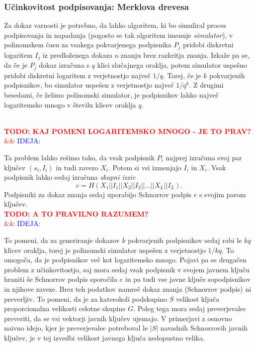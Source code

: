 \documentclass[isrm2, tisk]{fmfdelo}
\newcommand{\todo}[2][]{%
    \textcolor{red}{%
        \\ \textbf{\uppercase{todo: #2}}%
        \\%
        \ifx&#1&%
        \else%
            \textcolor{blue}{\uppercase{ideja:} #1}%
            \\%
        \fi%
    }%
}
\begin{document}
\subsubsection{Učinkovitost podpisovanja: Merklova drevesa}
Za dokaz varnosti je potrebno, da lahko algoritem, ki bo simuliral proces podpisovanja in napadanja 
(pogosto se tak algoritem imenuje \textit{simulator}), v polinomskem času za vsakega pokvarjenega 
podpisnika $P_j$ pridobi diskretni logaritem $I_j$ iz predloženega dokaza o znanju brez razkritja 
znanja. Izkaže pa se, da če je $P_j$ dokaz izračuna s $q$ klici slučajnega oraklja, potem simulator 
uspešno pridobi diskretni logaritem z verjetnostjo največ $1/q$. Torej, če je $k$ pokvarjenih 
podpisnikov, bo simulator uspešen z verjetnostjo največ $1/q^k$. Z drugimi besedami, če želimo 
polinomski simulator, je podpisnikov lahko največ logaritemsko mnogo v številu klicev oraklja $q$.

\todo{kaj pomeni logaritemsko mnogo - je to prav?}

Ta problem lahko rešimo tako, da vsak podpisnik $P_i$ najprej izračuna svoj par ključev $(s_i, I_i)$ 
in tudi zavezo $X_i$. Potem si vsi izmenjajo $I_i$ in $X_i$. Vsak podpisnik lahko sedaj izračuna 
\textit{skupni izziv} 
$$ 
e = H(X_1 || I_1 || X_2 || I_2 || \dots || X_L || I_L).
$$
Podpisniki za dokaz znanja sedaj uporabijo Schnorrov podpis $e$ s svojim parom ključev. 
\todo{a to pravilno razumem?}
To pomeni, da za generiranje dokazov $k$ pokvarjenih podpisnikov sedaj rabi le $kq$ klicev oraklja, 
torej je polinomski simulator uspešen z verjetnostjo $1/kq$. To omogoča, da je podpisnikov več 
kot logaritemsko mnogo. Pojavi pa se drugačen problem z učinkovitostjo, saj mora sedaj vsak podpisnik 
v svojem javnem ključu hraniti še Schnorrov podpis sporočila $e$ in pa tudi vse javne ključe 
sopodpisnikov in njihove zaveze. Brez teh podatkov namreč dokaz znanja (Schnorrov podpis) ni preverljiv. 
To pomeni, da je za katerokoli podskupino $S$ velikost ključa proporcionalna velikosti celotne skupine 
$G$. Poleg tega mora sedaj preverjevalec preveriti, da se vsi vektorji javnih ključev ujemajo. V primerjavi 
z osnovno naivno idejo, kjer je preverjevalec potreboval le $|S|$ navadnih Schnorrovih javnih ključev, 
je v tej izvedbi velikost javnega ključa nedopustno velika.
\end{document}
